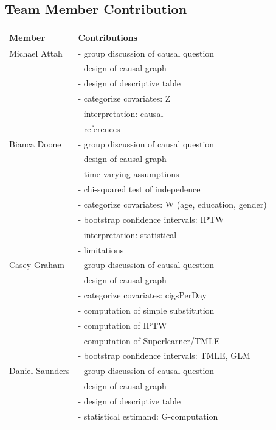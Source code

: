 \documentclass[]{article}
\begin{document}
\newpage

\subsection{Team Member Contribution}\label{team-member-contribution}

\begin{table}[h!]
  \begin{tabular}{|l|l|}
  \hline
    Member & Contributions \\ \hline
    Michael Attah & - group discussion of causal question \\
      & - design of causal graph \\
      & - design of descriptive table \\
      & - categorize covariates: Z\\
      & - interpretation: causal\\ 
      & - references \\ \hline
    Bianca Doone & - group discussion of causal question \\
      & - design of causal graph \\
      & - time-varying assumptions \\
      & - chi-squared test of indepedence\\
      & - categorize covariates: W (age, education, gender) \\
      & - bootstrap confidence intervals: IPTW \\
      & - interpretation: statistical \\
      & - limitations \\ \hline
    Casey Graham & - group discussion of causal question \\
      & - design of causal graph \\
      & - categorize covariates: cigsPerDay \\
      & - computation of simple substitution \\
      & - computation of IPTW \\
      & - computation of Superlearner/TMLE \\ 
      & - bootstrap confidence intervals: TMLE, GLM \\ \hline
    Daniel Saunders & - group discussion of causal question \\
      & - design of causal graph \\
      & - design of descriptive table \\
      & - statistical estimand: G-computation \\

\end{tabular}
\end{table}
\end{document}
